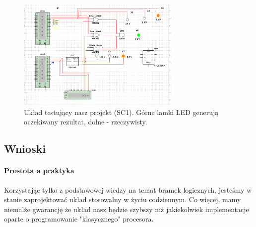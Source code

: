 \documentclass{article}
\begin{document}
\begin{figure}[H]
\includegraphics[width=0.7\textwidth]{testerMS}
\caption{Układ testujący nasz projekt (SC1). Górne lamki LED generują oczekiwany rezultat, dolne - rzeczywisty.}
\end{figure}


\subsection{Wnioski}
\paragraph{Prostota a praktyka}
Korzystając tylko z podstawowej wiedzy na temat bramek logicznych, jesteśmy w stanie zaprojektować układ stosowalny w życiu codziennym. Co więcej, mamy niemalże gwarancję że układ nasz będzie szybszy niż jakiekolwiek implementacje oparte o programowanie "klasycznego" procesora.
\end{document}
